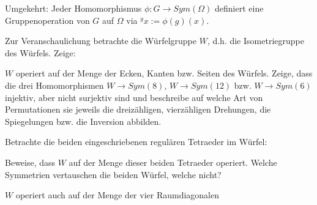 \begin{sheet}
\begin{problem}[title={Gruppenhomomorphismen}]
\begin{subproblem}
Umgekehrt: Jeder Homomorphismus $\phi: G\to Sym(\Omega)$ definiert eine Gruppenoperation von $G$ auf $\Omega$ via ${^g x} := \phi(g)(x)$.
\end{subproblem}

Zur Veranschaulichung betrachte die Würfelgruppe $W$, d.h. die Isometriegruppe des Würfels. Zeige:
\begin{subproblem}
$W$ operiert auf der Menge der Ecken, Kanten bzw. Seiten des Würfels. Zeige, dass die drei Homomorphismen $W\to Sym(8)$, $W\to Sym(12)$ bzw. $W\to Sym(6)$ injektiv, aber nicht surjektiv sind und beschreibe auf welche Art von Permutationen sie jeweils die dreizähligen, vierzähligen Drehungen, die Spiegelungen bzw. die Inversion abbilden.
\end{subproblem}
\begin{subproblem}
Betrachte die beiden eingeschriebenen regulären Tetraeder im Würfel:


Beweise, dass $W$ auf der Menge dieser beiden Tetraeder operiert. Welche Symmetrien vertauschen die beiden Würfel, welche nicht?
\end{subproblem}

\begin{subproblem}
$W$ operiert auch auf der Menge der vier Raumdiagonalen



\end{subproblem}
\end{problem}
\end{sheet}
